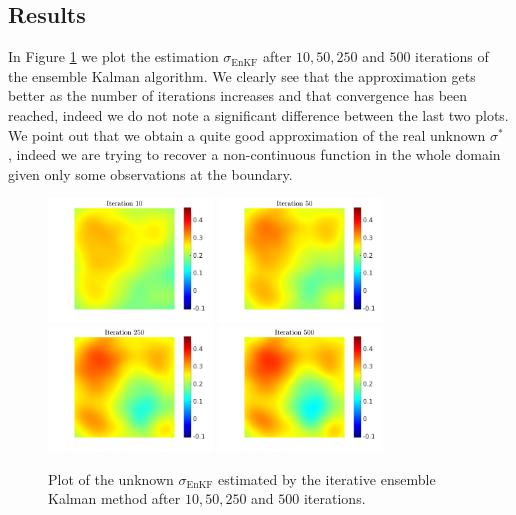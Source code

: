 \documentclass[10pt]{article}
\begin{document}
\subsection{Results}

In Figure \ref{fig:best_solution} we plot the estimation $\sigma_{\mathrm{EnKF}}$ after $10, 50, 250$ and $500$ iterations of the ensemble Kalman algorithm. We clearly see that the approximation gets better as the number of iterations increases and that convergence has been reached, indeed we do not note a significant difference between the last two plots. We point out that we obtain a quite good approximation of the real unknown $\sigma^*$ , indeed we are trying to recover a non-continuous function in the whole domain given only some observations at the boundary.

\begin{figure}[t]
\centering
\includegraphics[width = 0.39\textwidth]{figures/ensemble_10}
\includegraphics[width = 0.39\textwidth]{figures/ensemble_50}
\\
\includegraphics[width = 0.39\textwidth]{figures/ensemble_250}
\includegraphics[width = 0.39\textwidth]{figures/ensemble_500}
\caption{Plot of the unknown $\sigma_{\mathrm{EnKF}}$ estimated by the iterative ensemble Kalman method after $10, 50, 250$ and $500$ iterations.}
\label{fig:best_solution}
\end{figure}
\end{document}
